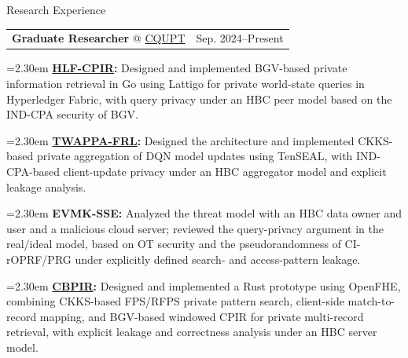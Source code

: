 \documentclass[11pt,a4paper]{article}
\makeatletter
\newcommand{\cvrow}[2]{%
  \noindent
  \begin{minipage}[t]{0.145\textwidth}
    \vspace{0pt}%
    \raggedright
    \fontsize{10.5}{12.5}\selectfont
    #1
  \end{minipage}%
  \hfill
  \begin{minipage}[t]{0.835\textwidth}
    \vspace{0pt}%
    #2
  \end{minipage}\par
}
\newcommand{\workentry}[2]{%
  \noindent
  \begin{tabularx}{\linewidth}
    {@{}X@{\hspace{0.8em}}r@{}}
    #1 & \small #2
  \end{tabularx}\par
  \vspace{0.15em}
}
\newcommand{\workproject}[1]{%
  \noindent
  \hangindent=2.30em
  \hangafter=1
  \hspace*{1.15em}\makebox[1.15em][l]{$\diamond$}#1\par
  \vspace{0.12em}
}
\makeatother
\begin{document}
\cvrow{Research Experience}{%
  \workentry
    {\textbf{Graduate Researcher} @
    \href{https://www.cqupt.edu.cn/}{CQUPT}}
    {Sep. 2024--Present}

  \workproject{\textbf{\href{https://github.com/iasenovets/2_2_HLF_CPIR}{HLF-CPIR}:}
  Designed and implemented BGV-based private information retrieval in Go using
  Lattigo for private world-state queries in Hyperledger Fabric,
  with query privacy under an HBC peer model based on the IND-CPA security of BGV.}

  \workproject{\textbf{\href{https://github.com/hetiantian10/TWAPPA-FRL}{TWAPPA-FRL}:}
  Designed the architecture and implemented CKKS-based
  private aggregation of DQN model updates using TenSEAL, with IND-CPA-based
  client-update privacy under an HBC aggregator model and explicit leakage analysis.}

  \workproject{\textbf{EVMK-SSE:} Analyzed the threat model with an HBC data owner
  and user and a malicious cloud server; reviewed the query-privacy argument in the
  real/ideal model, based on OT security and the pseudorandomness of CI-rOPRF/PRG under explicitly
  defined search- and access-pattern leakage.}



  \workproject{\textbf{\href{https://github.com/iasenovets/content-based-pir}{CBPIR}:}
  Designed and implemented a Rust prototype using OpenFHE, combining
  CKKS-based FPS/RFPS private pattern search, client-side match-to-record
  mapping, and BGV-based windowed CPIR for private multi-record retrieval,
  with explicit leakage and correctness analysis under an HBC server model.}
}

\vspace{0.75em}
\end{document}

